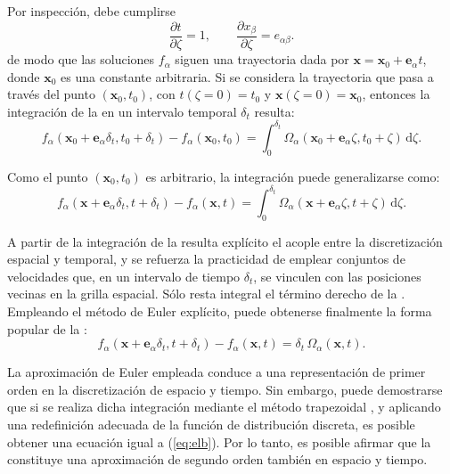 Por inspecci\'on, debe cumplirse
\begin{equation}
	\dfrac{\partial t}{\partial \zeta} = 1, \qquad
	\dfrac{\partial x_{\beta}}{\partial \zeta} = e_{\alpha\beta}.
\end{equation}
de modo que las soluciones $f_{\alpha}$ siguen una trayectoria dada por $\bm{x}=\bm{x}_0 + \bm{e}_{\alpha}t$, donde $\bm{x}_0$ es una constante arbitraria. Si se considera la trayectoria que pasa a trav\'es del punto $(\bm{x}_0,t_0)$, con $t(\zeta=0)=t_0$ y $\bm{x}(\zeta=0)=\bm{x}_0$, entonces la integraci\'on de la  en un intervalo temporal $\delta_t$ resulta:
\begin{equation}
	f_{\alpha}(\bm{x}_0+\bm{e}_{\alpha}\delta_t,t_0+\delta_t)-f_{\alpha}(\bm{x}_0,t_0)=\int_0^{\delta_t}\Omega_{\alpha}(\bm{x}_0+\bm{e}_{\alpha}\zeta,t_0+\zeta) \, \mbox{d}\zeta.
\end{equation}

Como el punto $(\bm{x}_0,t_0)$ es arbitrario, la integraci\'on puede generalizarse como:
\begin{equation}
	f_{\alpha}(\bm{x}+\bm{e}_{\alpha}\delta_t,t+\delta_t)-f_{\alpha}(\bm{x},t)=\int_0^{\delta_t}\Omega_{\alpha}(\bm{x}+\bm{e}_{\alpha}\zeta,t+\zeta) \, \mbox{d}\zeta.
	\label{eq:elb_integral}
\end{equation}

A partir de la integraci\'on de la  resulta expl\'icito el acople entre la discretizaci\'on espacial y temporal, y se refuerza la practicidad de emplear conjuntos de velocidades que, en un intervalo de tiempo $\delta_t$, se vinculen con las posiciones vecinas en la grilla espacial.
S\'olo resta integral el t\'ermino derecho de la . Empleando el m\'etodo de Euler expl\'icito, puede obtenerse finalmente la forma popular de la \lbe{}:
\begin{equation}
	f_{\alpha}(\bm{x}+\bm{e}_{\alpha}\delta_t,t+\delta_t)-f_{\alpha}(\bm{x},t)=\delta_t \, \Omega_{\alpha}(\bm{x},t).
	\label{eq:elb}
\end{equation}

La aproximaci\'on de Euler empleada conduce a una representaci\'on de primer orden en la discretizaci\'on de espacio y tiempo. Sin embargo, puede demostrarse que si se realiza dicha integraci\'on mediante el m\'etodo trapezoidal \cite{he_discrete_1998}, y aplicando una redefinici\'on adecuada de la funci\'on de distribuci\'on discreta, es posible obtener una ecuaci\'on igual a (\ref{eq:elb}). Por lo tanto, es posible afirmar que la  constituye una aproximaci\'on de segundo orden tambi\'en en espacio y tiempo.



